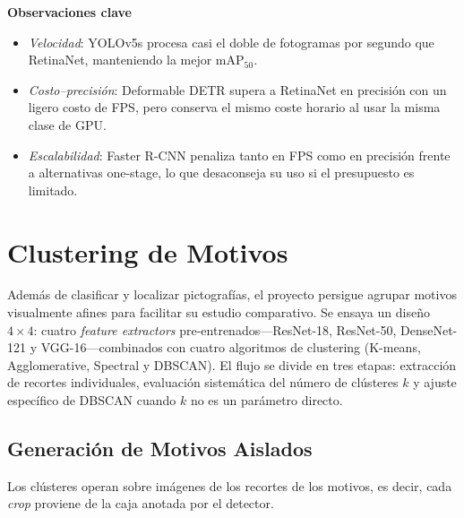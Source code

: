 \noindent
\textbf{Observaciones clave}

\begin{itemize}
  \item \emph{Velocidad}: YOLOv5s procesa casi el doble de fotogramas por segundo que RetinaNet, manteniendo la mejor \(\text{mAP}_{50}\).
  \item \emph{Costo–precisión}: Deformable DETR supera a RetinaNet en precisión con un ligero costo de FPS, pero conserva el mismo coste horario al usar la misma clase de GPU.
  \item \emph{Escalabilidad}: Faster R-CNN penaliza tanto en FPS como en precisión frente a alternativas one-stage, lo que desaconseja su uso si el presupuesto es limitado.
\end{itemize}

\section{Clustering de Motivos}\label{sec:clustering}

Además de clasificar y localizar pictografías, el proyecto persigue agrupar motivos visualmente afines para facilitar su estudio comparativo.
Se ensaya un diseño \(4\times4\): cuatro \emph{feature extractors} pre-entrenados—ResNet-18, ResNet-50, DenseNet-121 y VGG-16—combinados con cuatro algoritmos de clustering (K-means, Agglomerative, Spectral y DBSCAN).
El flujo se divide en tres etapas: extracción de recortes individuales, evaluación sistemática del número de clústeres \(k\) y ajuste específico de DBSCAN cuando \(k\) no es un parámetro directo.

\subsection{Generación de Motivos Aislados}\label{ssec:crop_motifs}

Los clústeres operan sobre imágenes de los recortes de los motivos, es decir, cada \emph{crop} proviene de la caja anotada por el detector.

